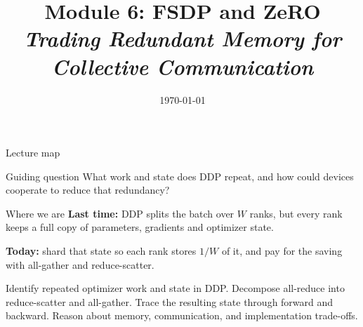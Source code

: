 \documentclass[handout]{beamer}
\title[TASLLM -- Module 6]{Module 6: FSDP and ZeRO\\[4pt]
\normalsize\itshape Trading Redundant Memory for Collective Communication}
\date{\today}
\begin{document}
\makelecturetitle
\begin{frame}{Lecture map}
  \tableofcontents
  \vfill
  \begin{block}{Guiding question}
    What work and state does DDP repeat, and how could devices cooperate to reduce that redundancy?
  \end{block}
\end{frame}

\begin{frame}{Where we are}
  \vspace{10pt}
  \textbf{\textcolor{accentdark}{Last time:}} DDP splits the batch over $W$ ranks, but every rank keeps a full copy of parameters, gradients and optimizer state.\par
  \vspace{10pt}
  \textbf{\textcolor{signaldark}{Today:}} shard that state so each rank stores $1/W$ of it, and pay for the saving with all-gather and reduce-scatter.
\end{frame}
\learninggoals
{Identify repeated optimizer work and state in DDP.}
{Decompose all-reduce into reduce-scatter and all-gather.}
{Trace the resulting state through forward and backward.}
{Reason about memory, communication, and implementation trade-offs.}
\end{document}

